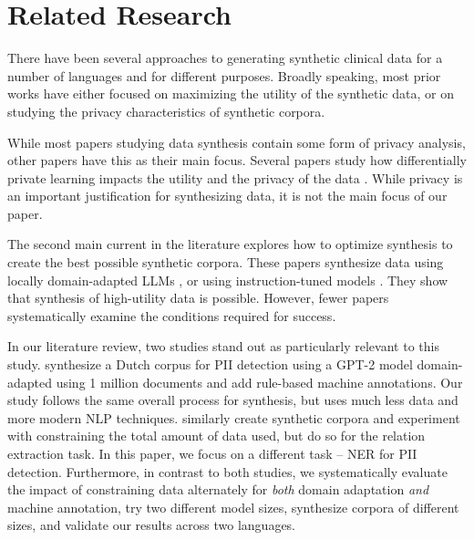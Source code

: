 \section{Related Research}
There have been several approaches to generating synthetic clinical data for a number of languages and for different purposes. Broadly speaking, most prior works have either focused on maximizing the utility of the synthetic data, or on studying the privacy characteristics of synthetic corpora.

While most papers studying data synthesis contain some form of privacy analysis, other papers have this as their main focus. Several papers study how differentially private learning impacts the utility \cite{Yue-etal-2023,igamberdiev_dp-nmt_2024} and the privacy of the data \cite{Miranda-etal-2024}. While privacy is an important justification for synthesizing data, it is not the main focus of our paper.

The second main current in the literature explores how to optimize synthesis to create the best possible synthetic corpora. These papers synthesize data using locally domain-adapted LLMs \cite{ive2020generation,hiebel2023can}, or using instruction-tuned models \cite{kiefer2024instruction,Liu-etal-2025}. They show that synthesis of high-utility data is possible. However, fewer papers systematically examine the conditions required for success.

In our literature review, two studies stand out as particularly relevant to this study. \citet{libbi2021generating} synthesize a Dutch corpus for PII detection using a GPT-2 model \cite{radford_language_2019} domain-adapted using 1 million documents and add rule-based machine annotations. Our study follows the same overall process for synthesis, but uses much less data and more modern NLP techniques. \citet{Xu-etal-2023a} similarly create synthetic corpora and experiment with constraining the total amount of data used, but do so for the relation extraction task. In this paper, we focus on a different task -- NER for PII detection. Furthermore, in contrast to both studies, we systematically evaluate the impact of constraining data alternately for \textit{both} domain adaptation \textit{and} machine annotation, try two different model sizes, synthesize corpora of different sizes, and validate our results across two languages.
